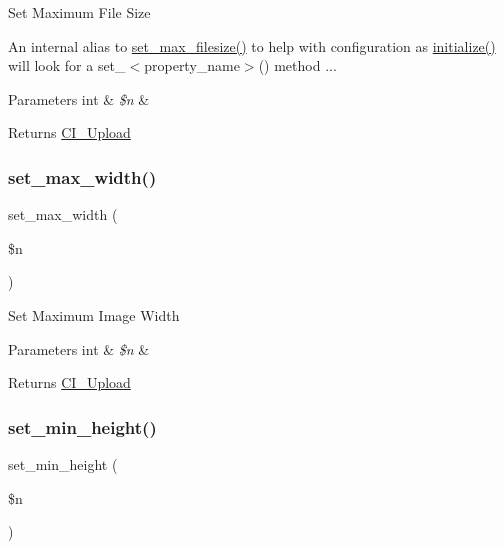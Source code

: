 Set Maximum File Size

An internal alias to \mbox{\hyperlink{class_c_i___upload_a1f78c3a54f32d313294b27cde4eafaf4}{set\+\_\+max\+\_\+filesize()}} to help with configuration as \mbox{\hyperlink{class_c_i___upload_a58cef448bae0c178f3f675700b7e4413}{initialize()}} will look for a set\+\_\+$<$property\+\_\+name$>$() method ...


\begin{DoxyParams}[1]{Parameters}
int & {\em \$n} & \\
\hline
\end{DoxyParams}
\begin{DoxyReturn}{Returns}
\mbox{\hyperlink{class_c_i___upload}{C\+I\+\_\+\+Upload}} 
\end{DoxyReturn}
\mbox{\label{class_c_i___upload_a4028f187a825a666976cc3fe47cd44a8}} 
\subsubsection{\texorpdfstring{set\+\_\+max\+\_\+width()}{set\_max\_width()}}
{\footnotesize\ttfamily set\+\_\+max\+\_\+width (\begin{DoxyParamCaption}\item[{}]{\$n }\end{DoxyParamCaption})}

Set Maximum Image Width


\begin{DoxyParams}[1]{Parameters}
int & {\em \$n} & \\
\hline
\end{DoxyParams}
\begin{DoxyReturn}{Returns}
\mbox{\hyperlink{class_c_i___upload}{C\+I\+\_\+\+Upload}} 
\end{DoxyReturn}
\mbox{\label{class_c_i___upload_a72c6007605b27c92dfd83c6e21fe82e3}} 
\subsubsection{\texorpdfstring{set\+\_\+min\+\_\+height()}{set\_min\_height()}}
{\footnotesize\ttfamily set\+\_\+min\+\_\+height (\begin{DoxyParamCaption}\item[{}]{\$n }\end{DoxyParamCaption})}


